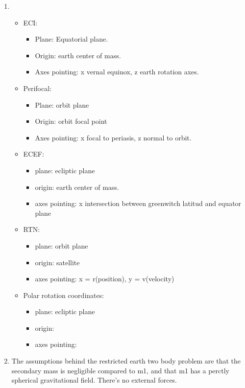\documentclass[a4paper]{article}
\begin{document}
\begin{enumerate}[label=\emph{\alph*)}]
  \item %
    \begin{itemize}[label=\textbullet]
      \item ECI:
	\begin{itemize}
	  \item Plane: Equatorial plane.
	  \item Origin: earth center of mass.
	  \item Axes pointing: x vernal equinox, z earth rotation axes.
	\end{itemize}
      \item Perifocal:
	\begin{itemize}
	  \item Plane: orbit plane
	  \item Origin: orbit focal point
	  \item Axes pointing: x focal to periasis, z normal to orbit.
	\end{itemize}
      \item ECEF:
	\begin{itemize}
	  \item plane: ecliptic plane 
	  \item origin: earth center of mass.
	  \item axes pointing: x intersection between greenwitch latitud  and equator plane
	\end{itemize}
      \item RTN:
	\begin{itemize}
	  \item plane: orbit plane
	  \item origin: satellite
	  \item axes pointing: x = r(position), y = v(velocity)
	\end{itemize}
      \item Polar rotation coordinates:
	\begin{itemize}
	  \item plane: ecliptic plane
	  \item origin:
	  \item axes pointing:
	\end{itemize}
    \end{itemize}

  \item %
    The assumptions behind the restricted earth two body problem are that the secondary mass is negligible compared to m1, and that m1 has a perctly spherical gravitational field. There's no external forces.


\end{enumerate}
\end{document}
